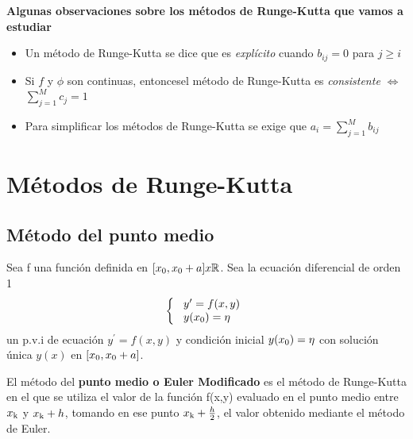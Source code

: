 \documentclass[paper=a4, fontsize=11pt]{scrartcl} %
\numberwithin{equation}{section}
\begin{document}
 	 \begin{center}
 	 \end{center}
 	 \textbf{Algunas observaciones sobre los métodos de Runge-Kutta que vamos a estudiar}
 	 \begin{itemize}
 	 	\item Un método de Runge-Kutta se dice que es \textit{explícito} cuando $b_{ij}=0$ para $j\geq i$
 	 	\item Si $f$ y $\phi$ son continuas, entonces\newline el método de Runge-Kutta es \textit{consistente} $\iff$ $\sum_{j=1}^{M}c_j=1$
 	 	\item Para simplificar los métodos de Runge-Kutta se exige que $a_i=\sum_{j=1}^{M}b_{ij}$
 	 \end{itemize}
	\section{Métodos de Runge-Kutta}
	\subsection{Método del punto medio}
	Sea f una función definida en $[x\textsubscript{0},x\textsubscript{0}+a] x \mathbb{R}$.
	Sea la ecuación diferencial de orden 1
	\begin{equation*}
	\left\lbrace
	\begin{array}{l}
	\ y^\prime = f(x,y) \\
	\ y(x\textsubscript{0}) = \eta \\
	\end{array}
	\right.
	\end{equation*}
	un p.v.i de ecuación $y^\prime = f(x,y)$ y condición inicial $y(x\textsubscript{0}) = \eta$ con solución única $y(x)$ en $[x\textsubscript{0},x\textsubscript{0}+a]$.
	
	\setlength{\parskip}{10pt}El método del \textbf{punto medio o Euler Modificado} es el método de Runge-Kutta en el que se utiliza el valor de la función f(x,y) evaluado en el punto medio entre $x\textsubscript{k}$ y $x\textsubscript{k}+h$, tomando en ese punto $x\textsubscript{k} + \frac{h}{2}$, el valor obtenido mediante el método de Euler.
	
\end{document}
